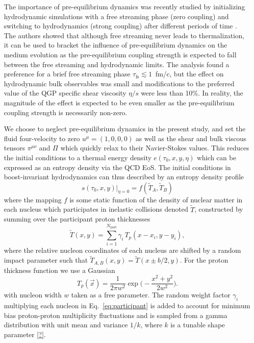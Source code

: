 \documentclass[aps,prc,reprint,amsmath,nofootinbib,superscriptaddress]{revtex4-1}
\newcommand{\T}{\tilde{T}}
\begin{document}
The importance of pre-equilibrium dynamics was recently studied by initializing hydrodynamic simulations with a free streaming phase (zero coupling) and switching to hydrodynamics (strong coupling) after different periods of time \cite{Liu:2015nwa}.
The authors showed that although free streaming never leads to thermalization, it can be used to bracket the influence of pre-equilibrium dynamics on the medium evolution as the pre-equilibrium coupling strength is expected to fall between the free streaming and hydrodynamic limits.
The analysis found a preference for a brief free streaming phase ${\tau_\text{fs} \lesssim 1}$~fm/c, but the effect on hydrodynamic bulk observables was small and modifications to the preferred value of the QGP specific shear viscosity $\eta/s$ were less than 10\%.
In reality, the magnitude of the effect is expected to be even smaller as the pre-equilibrium coupling strength is necessarily non-zero.

We choose to neglect pre-equilibrium dynamics in the present study, and set the fluid four-velocity to zero ${u^\mu = (1,0,0,0)}$ as well as the shear and bulk viscous tensors $\pi^{\mu\nu}$ and $\Pi$ which quickly relax to their Navier-Stokes values.
This reduces the initial conditions to a thermal energy density $e(\tau_0, x, y, \eta)$ which can be expressed as an entropy density via the QCD EoS.
The initial conditions in boost-invariant hydrodynamics can thus described by an entropy density profile
\begin{equation}
  s(\tau_0, x, y)\vert_{\eta=0} = f(\T_A, \T_B)
  \label{eq:mapping}
\end{equation}
where the mapping $f$ is some static function of the density of nuclear matter in each nucleus which participates in inelastic collisions denoted $\T$, constructed by summing over the participant proton thicknesses
\begin{equation}
  \T(x, y) = \sum\limits_{i=1}^{N_\text{part}} \gamma_i\, T_p(x - x_i, y - y_i),
  \label{eq:participant}
\end{equation}
where the relative nucleon coordinates of each nucleus are shifted by a random impact parameter such that ${\T_{A,B}(x, y) = \T(x \pm b/2, y)}$.
For the proton thickness function we use a Gaussian
\begin{equation}
  T_p(\vec{x}) = \frac{1}{2\pi w^2} \exp\bigg(\!-\frac{x^2 + y^2}{2 w^2}\bigg).
\end{equation}
with nucleon width $w$ taken as a free parameter.
The random weight factor $\gamma_i$ multiplying each nucleon in Eq.~\eqref{eq:participant} is added to account for minimum bias proton-proton multiplicity fluctuations and is sampled from a gamma distribution with unit mean and variance $1/k$, where $k$ is a tunable shape parameter \ref{?}.
\end{document}
